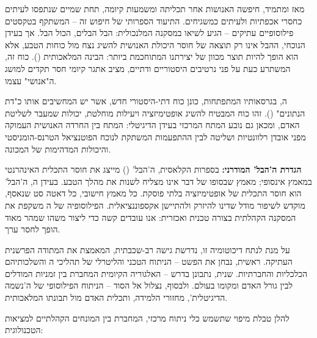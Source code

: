 \label{sec:chapter17}


מאז ומתמיד, חיפשה האנושות אחר תכליתה ומשמעות קיומה, תחת שמיים שנתפסו לעיתים כחסרי אכפתיות ולעיתים כמשגיחים. התיעוד הספרותי של חיפוש זה – המשתקף בטקסטים פילוסופיים עתיקים – הגיע לשיאו במסקנה המלנכולית: הבל הבלים, הכול הבל. אך בעידן הנוכחי, ההבל אינו רק תוצאה של חוסר היכולת האנושית להשיג נצח מול כוחות הטבע, אלא הוא הופך להיות תוצר מכוון של יצירתנו המתוחכמת ביותר: הבינה המלאכותית (). כוח זה, המשתרע כעת על פני נרטיבים היסטוריים ודתיים, מציב אתגר קיומי חסר תקדים למושג ה"אנושי" עצמו.

ה, בגרסאותיו המתפתחות, כונן כוח דתי-היסטורי חדש, אשר יש המחשיבים אותו כ"דת הנתונים" (). זהו כוח המבטיח להשיג אופטימיזציה ויעילות מוחלטת, יכולות שמעבר לשליטת האדם, ומכאן גם נובע המתח המרכזי בעידן הדיגיטלי: המתח בין החרדה האנושית העמוקה מפני אובדן רלוונטיות ושליטה לבין ההתפעמות המשתקת לנוכח הפוטנציאל הטרנס-הומניסטי והיכולות המדהימות של המכונה.

\textbf{הגדרת ה'הבל' המודרני:} בספרות הקלאסית, ה'הבל' () מייצג את חוסר התכלית האינהרנטי במאמץ אינסופי; מאמץ שבסופו של דבר אינו מצליח לשנות את מהלך הטבע. בעידן ה, ה'הבל' הוא חוסר התכלית של אופטימיזציה בלתי פוסקת. כל מאמץ חישובי, כל דאטה סט שנאסף, מוקדש לשיפור מודל שדינו להיזרק ולהתיישן אקספוננציאלית. הפילוסופיה של ה משקפת את המסקנה הקהלתית בצורה טכנית ואכזרית: אנו עובדים קשה כדי ליצור משהו שמהר מאוד הופך לחסר ערך.

על מנת לנתח דיכוטומיה זו, נדרשת גישה רב-שכבתית, המאמצת את המתודה הפרשנית העתיקה. ראשית, נבחן את הפשט – הניתוח הטכני והליטרלי של תהליכי ה והשלכותיהם הכלכליות והחברתיות. שנית, נתבונן בדרש – האלגוריה הקיומית המחברת בין זמניות המודלים לבין גורל האדם ומקומו בעולם. ולבסוף, נצלול אל הסוד – הניתוח הפילוסופי של ה'נשמה הדיגיטלית', מחזורי הלמידה, ותכלית האדם מול תבונתו המלאכותית.

להלן טבלת מיפוי שתשמש כלי ניתוח מרכזי, המחברת בין המונחים הקהלתיים למציאות הטכנולוגית:

